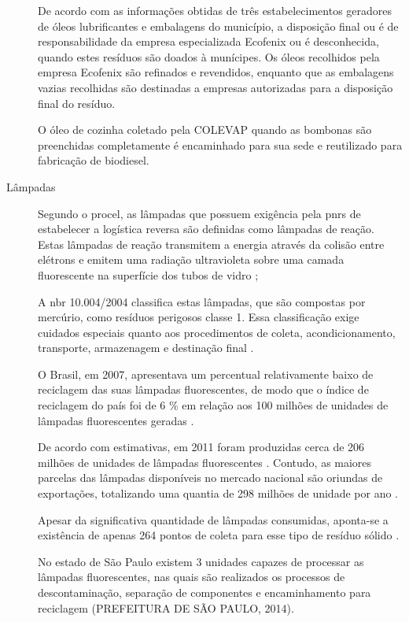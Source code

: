 \begin{description}
	De acordo com as informações obtidas de três estabelecimentos geradores de óleos lubrificantes e embalagens do município, a disposição final ou é de responsabilidade da empresa especializada Ecofenix ou é desconhecida, quando estes resíduos são doados à munícipes. Os óleos recolhidos pela empresa Ecofenix são refinados e revendidos, enquanto que as embalagens vazias recolhidas são destinadas a empresas autorizadas para a disposição final do resíduo.
	
	O óleo de cozinha coletado pela COLEVAP quando as bombonas são preenchidas completamente é encaminhado para sua sede e reutilizado para fabricação de biodiesel.
	
	
	\item[Lâmpadas] Segundo o \gls{procel}, as lâmpadas que possuem exigência pela \gls{pnrs} de estabelecer a logística reversa são definidas como lâmpadas de reação. Estas lâmpadas de reação transmitem a energia através da colisão entre elétrons e emitem uma radiação ultravioleta sobre uma camada fluorescente na superfície dos tubos de vidro \cite{PROCEL2011};
	
	A \gls{nbr} 10.004/2004 classifica estas lâmpadas, que são compostas por mercúrio, como resíduos perigosos classe 1. Essa classificação exige cuidados especiais quanto aos procedimentos de coleta, acondicionamento, transporte, armazenagem e destinação final \cite{ABNT:10004}.
	
	O Brasil, em 2007, apresentava um percentual relativamente baixo de reciclagem das suas lâmpadas fluorescentes, de modo que o índice de reciclagem do país foi de 6 \% em relação aos 100 milhões de unidades de lâmpadas fluorescentes geradas \cite{Bacila2015}.
	
	De acordo com estimativas, em 2011 foram produzidas cerca de 206 milhões de unidades de lâmpadas fluorescentes \cite{Bacila2015}. Contudo, as maiores parcelas das lâmpadas disponíveis no mercado nacional são oriundas de exportações, totalizando uma quantia de 298 milhões de unidade por ano \cite{Mourao:2012}.
	
	Apesar da significativa quantidade de lâmpadas consumidas, aponta-se a existência de apenas 264 pontos de coleta para esse tipo de resíduo sólido \cite{Bacila2015}.
	
	No estado de São Paulo existem 3 unidades capazes de processar as lâmpadas fluorescentes, nas quais são realizados os processos de descontaminação, separação de componentes e encaminhamento para reciclagem (PREFEITURA DE SÃO PAULO, 2014).
	

\end{description}
